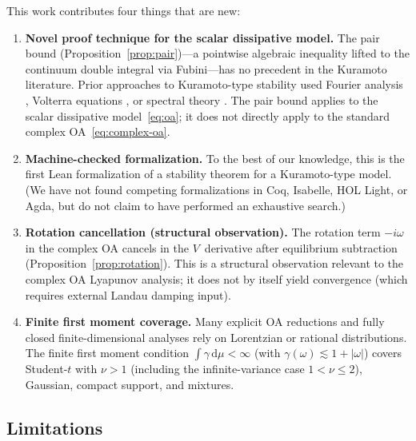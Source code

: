 \documentclass[11pt,a4paper]{article}
\theoremstyle{definition}
\begin{document}
This work contributes four things that are new:

\begin{enumerate}
\item \textbf{Novel proof technique for the scalar dissipative model.} The pair bound (Proposition~\ref{prop:pair})---a pointwise algebraic inequality lifted to the continuum double integral via Fubini---has no precedent in the Kuramoto literature. Prior approaches to Kuramoto-type stability used Fourier analysis \cite{dietert2016}, Volterra equations \cite{dietert-fernandez2018}, or spectral theory \cite{chiba2015}. The pair bound applies to the scalar dissipative model~\eqref{eq:oa}; it does not directly apply to the standard complex OA~\eqref{eq:complex-oa}.

\item \textbf{Machine-checked formalization.} To the best of our knowledge, this is the first Lean formalization of a stability theorem for a Kuramoto-type model. (We have not found competing formalizations in Coq, Isabelle, HOL Light, or Agda, but do not claim to have performed an exhaustive search.)

\item \textbf{Rotation cancellation (structural observation).} The rotation term $-i\omega$ in the complex OA cancels in the $V$~derivative after equilibrium subtraction (Proposition~\ref{prop:rotation}). This is a structural observation relevant to the complex OA Lyapunov analysis; it does not by itself yield convergence (which requires external Landau damping input).

\item \textbf{Finite first moment coverage.} Many explicit OA reductions and fully closed finite-dimensional analyses rely on Lorentzian or rational distributions. The finite first moment condition $\int \gamma\,\mathrm{d}\mu < \infty$ (with $\gamma(\omega) \lesssim 1+|\omega|$) covers Student-$t$ with $\nu > 1$ (including the infinite-variance case $1 < \nu \leq 2$), Gaussian, compact support, and mixtures.
\end{enumerate}

\subsection{Limitations}
\end{document}
